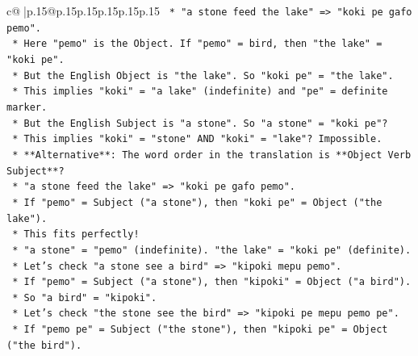 \documentclass{article}
\begin{document}
{\begin{supertabular}{c@{$\;$}|p{.15\linewidth}@{}p{.15\linewidth}p{.15\linewidth}p{.15\linewidth}p{.15\linewidth}p{.15\linewidth}}
{{{\texttt{                                            *   "a stone feed the lake" => "koki pe gafo pemo".} \\
\texttt{                                            *   Here "pemo" is the Object. If "pemo" = bird, then "the lake" = "koki pe".} \\
\texttt{                                            *   But the English Object is "the lake". So "koki pe" = "the lake".} \\
\texttt{                                            *   This implies "koki" = "a lake" (indefinite) and "pe" = definite marker.} \\
\texttt{                                            *   But the English Subject is "a stone". So "a stone" = "koki pe"?} \\
\texttt{                                            *   This implies "koki" = "stone" AND "koki" = "lake"? Impossible.} \\
\texttt{                                            *   **Alternative**: The word order in the translation is **Object Verb Subject**?} \\
\texttt{                                                *   "a stone feed the lake" => "koki pe gafo pemo".} \\
\texttt{                                                *   If "pemo" = Subject ("a stone"), then "koki pe" = Object ("the lake").} \\
\texttt{                                                *   This fits perfectly!} \\
\texttt{                                                *   "a stone" = "pemo" (indefinite). "the lake" = "koki pe" (definite).} \\
\texttt{                                                *   Let's check "a stone see a bird" => "kipoki mepu pemo".} \\
\texttt{                                                    *   If "pemo" = Subject ("a stone"), then "kipoki" = Object ("a bird").} \\
\texttt{                                                    *   So "a bird" = "kipoki".} \\
\texttt{                                                *   Let's check "the stone see the bird" => "kipoki pe mepu pemo pe".} \\
\texttt{                                                    *   If "pemo pe" = Subject ("the stone"), then "kipoki pe" = Object ("the bird").} \\
}}}
\end{supertabular}}
\end{document}
